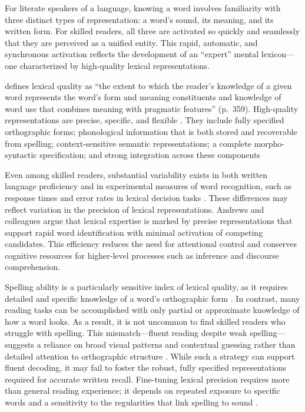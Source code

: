 \documentclass[preprint,12pt, authoryear, review]{elsarticle}
\begin{document}
For literate speakers of a language, knowing a word involves familiarity with three distinct types of representation: a word’s sound, its meaning, and its written form. For skilled readers, all three are activated so quickly and seamlessly that they are perceived as a unified entity. This rapid, automatic, and synchronous activation reflects the development of an “expert” mental lexicon—one characterized by high-quality lexical representations.

\citet{perfettiReadingAbilityLexical2007} defines lexical quality as “the extent to which the reader’s knowledge of a given word represents the word’s form and meaning constituents and knowledge of word use that combines meaning with pragmatic features” (p. 359). High-quality representations are precise, specific, and flexible \citep{perfettiReadingAbilityLexical2007}. They include fully specified orthographic forms; phonological information that is both stored and recoverable from spelling; context-sensitive semantic representations; a complete morpho-syntactic specification; and strong integration across these components \citep{perfettiLexicalQualityHypothesis2002, perfettiReadingAbilityLexical2007, perfettiLexicalQualityRevisited2017}
  
Even among skilled readers, substantial variability exists in both written language proficiency and in experimental measures of word recognition, such as response times and error rates in lexical decision tasks \citep{andrewsIndividualDifferencesSkilled2012}. These differences may reflect variation in the precision of lexical representations. Andrews and colleagues \citep{andrewsLexicalExpertiseReading2009, andrewsLexicalPrecisionSkilled2010, andrewsIndividualDifferencesSkilled2012, andrewsMorphologicalPrimingStronger2013} argue that lexical expertise is marked by precise representations that support rapid word identification with minimal activation of competing candidates. This efficiency reduces the need for attentional control and conserves cognitive resources for higher-level processes such as inference and discourse comprehension.

Spelling ability is a particularly sensitive index of lexical quality, as it requires detailed and specific knowledge of a word’s orthographic form \citep{perfettiRepresentationProblemReading1992}. In contrast, many reading tasks can be accomplished with only partial or approximate knowledge of how a word looks. As a result, it is not uncommon to find skilled readers who struggle with spelling. This mismatch—fluent reading despite weak spelling—suggests a reliance on broad visual patterns and contextual guessing rather than detailed attention to orthographic structure \citep{frithSurfaceDevelopmentalDyslexia2017}. While such a strategy can support fluent decoding, it may fail to foster the robust, fully specified representations required for accurate written recall. Fine-tuning lexical precision requires more than general reading experience; it depends on repeated exposure to specific words and a sensitivity to the regularities that link spelling to sound \citep{sharePhonologicalRecodingSelfteaching1995}.
\end{document}
